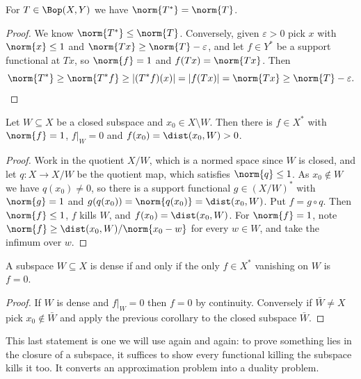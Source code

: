 \begin{corollary}
	For $T \in \Bop(X,Y)$ we have $\norm{T^*} = \norm{T}$.
\end{corollary}

\begin{proof}
	We know $\norm{T^*} \leq \norm{T}$. Conversely, given $\varepsilon > 0$ pick $x$ with $\norm{x} \leq 1$ and $\norm{Tx} \geq \norm{T} - \varepsilon$, and let $f \in Y^*$ be a support functional at $Tx$, so $\norm{f}=1$ and $f(Tx) = \norm{Tx}$. Then
	$$\norm{T^*} \geq \norm{T^*f} \geq |(T^*f)(x)| = |f(Tx)| = \norm{Tx} \geq \norm{T} - \varepsilon. \qedhere$$
\end{proof}

\begin{corollary}
	Let $W \subseteq X$ be a closed subspace and $x_0 \in X \setminus W$. Then there is $f \in X^*$ with $\norm{f} = 1$, $f|_W = 0$ and $f(x_0) = \dist(x_0, W) > 0$.
\end{corollary}

\begin{proof}
	Work in the quotient $X/W$, which is a normed space since $W$ is closed, and let $q : X \to X/W$ be the quotient map, which satisfies $\norm{q} \leq 1$. As $x_0 \notin W$ we have $q(x_0) \neq 0$, so there is a support functional $g \in (X/W)^*$ with $\norm{g}=1$ and $g(q(x_0)) = \norm{q(x_0)} = \dist(x_0, W)$. Put $f = g \circ q$. Then $\norm{f} \leq 1$, $f$ kills $W$, and $f(x_0) = \dist(x_0,W)$. For $\norm{f} = 1$, note $\norm{f} \geq \dist(x_0,W)/\norm{x_0 - w}$ for every $w \in W$, and take the infimum over $w$.
\end{proof}

\begin{corollary}
	A subspace $W \subseteq X$ is dense if and only if the only $f \in X^*$ vanishing on $W$ is $f = 0$.
\end{corollary}

\begin{proof}
	If $W$ is dense and $f|_W = 0$ then $f = 0$ by continuity. Conversely if $\bar W \neq X$ pick $x_0 \notin \bar W$ and apply the previous corollary to the closed subspace $\bar W$.
\end{proof}

This last statement is one we will use again and again: to prove something lies in the closure of a subspace, it suffices to show every functional killing the subspace kills it too. It converts an approximation problem into a duality problem.

